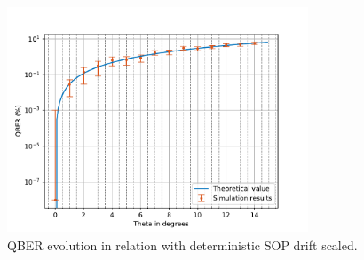 \begin{refsection}
\begin{figure}[H]
    \centering
        \includegraphics[clip, trim=0.2cm 0.0cm 0.5cm 1cm, width=0.80\textwidth]{./sdf/bb84_with_discrete_variables/figures/QBER_vs_theta_upto15.pdf}
    \caption{QBER evolution in relation with deterministic SOP drift scaled.}\label{qber_log_scaled}
\end{figure}
\newpage


\end{refsection}
